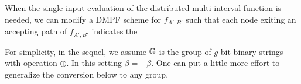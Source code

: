 When the single-input evaluation of the distributed multi-interval function is needed, we can modify a DMPF scheme for $f_{A',B'}$ such that each node exiting an accepting path of $f_{A',B'}$ indicates the 



For simplicity, in the sequel, we assume $\mathbb{G}$ is the group of $g$-bit binary strings with operation $\oplus$. In this setting $\beta = -\beta$. One can put a little more effort to generalize the conversion below to any group. 


